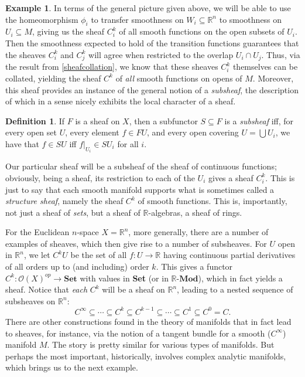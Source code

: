\documentclass[a4paper]{book}
\theoremstyle{definition}
\newtheorem{example}{Example}[section]
\theoremstyle{definition}
\newtheorem{definition}{Definition}[section]
\theoremstyle{definition}
\theoremstyle{theorem}
\theoremstyle{definition}
\begin{document}
\begin{example}
	In terms of the general picture given above, we will be able to use the homeomorphism $\phi_i$ to transfer smoothness on $W_i \subseteq \mathbb{R}^n$ to smoothness on $U_i \subseteq M$, giving us the sheaf $C_i^k$ of all smooth functions on the open subsets of $U_i$. Then the smoothness expected to hold of the transition functions guarantees that the sheaves $C^k_i$ and $C^k_j$ will agree when restricted to the overlap $U_i \cap U_j$. Thus, via the result from \ref{sheafcollation}, we know that these sheaves $C^k_i$ themselves can be collated, yielding the sheaf $C^k$ of \textit{all} smooth functions on opens of $M$. Moreover, this sheaf provides an instance of the general notion of a \textit{subsheaf}, the description of which in a sense nicely exhibits the local character of a sheaf.   
	\begin{definition}
		If $F$ is a sheaf on $X$, then a subfunctor $S \subseteq F$ is a \textit{subsheaf} iff, for every open set $U$, every element $f \in FU$, and every open covering $U = \bigcup U_i$, we have that $f \in SU$ iff $f|_{U_i} \in SU_i$ for all $i$.
	\end{definition} \noindent 
Our particular sheaf will be a subsheaf of the sheaf of continuous functions; obviously, being a sheaf, its restriction to each of the $U_i$ gives a sheaf $C^k_i$. This is just to say that each smooth manifold supports what is sometimes called a \textit{structure sheaf}, namely the sheaf $C^k$ of smooth functions. This is, importantly, not just a sheaf of \textit{sets}, but a sheaf of $\mathbb{R}$-algebras, a sheaf of rings. \par 
For the Euclidean $n$-space $X = \mathbb{R}^n$, more generally, there are a number of examples of sheaves, which then give rise to a number of subsheaves. For $U$ open in $\mathbb{R}^n$, we let $C^k U$ be the set of all $f: U \rightarrow \mathbb{R}$ having continuous partial derivatives of all orders up to (and including) order $k$. This gives a functor $C^k : \mathscr{O}(X)^{op} \rightarrow \textbf{Set}$ with values in \textbf{Set} (or in $\mathbb{R}$-$\textbf{Mod}$), which in fact yields a sheaf. Notice that \textit{each} $C^k$ will be a sheaf on $\mathbb{R}^n$, leading to a nested sequence of subsheaves on $\mathbb{R}^n$: 
		\begin{equation*}
		C^{\infty} \subseteq \cdots \subseteq C^k \subseteq C^{k-1} \subseteq \cdots \subseteq C^1 \subseteq C^0 = C.
		\end{equation*}
There are other constructions found in the theory of manifolds that in fact lead to sheaves, for instance, via the notion of a tangent bundle for a smooth ($C^{\infty}$) manifold $M$. The story is pretty similar for various types of manifolds. But perhaps the most important, historically, involves complex analytic manifolds, which brings us to the next example.
\end{example}
\end{document}
